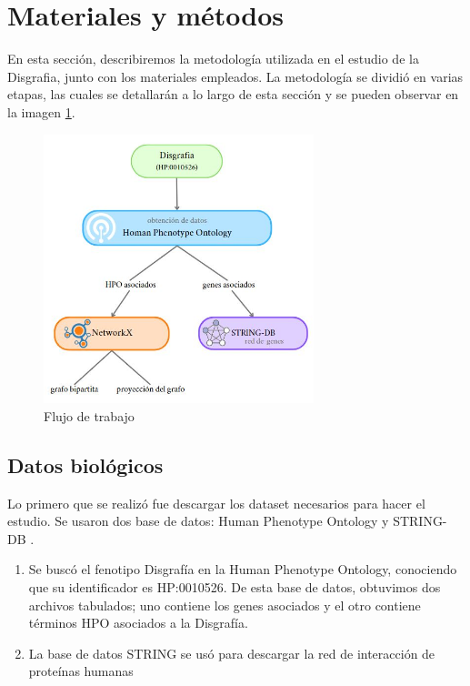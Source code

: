 \section{Materiales y métodos}

En esta sección, describiremos la metodología utilizada en el estudio de la Disgrafia,
junto con los materiales empleados. La metodología se dividió en varias etapas, las
cuales se detallarán a lo largo de esta sección y se pueden observar en la imagen \ref{fig:workflow}.

\begin{figure}[h!]
	\centering
	\includegraphics[width=0.7\textwidth]{figures/workflow.JPG}
	\caption{Flujo de trabajo}
	\label{fig:workflow}
\end{figure}

\subsection{Datos biológicos}

Lo primero que se realizó fue descargar los dataset necesarios para hacer el estudio. Se usaron dos base de datos: Human Phenotype Ontology \cite{HPO2021} y STRING-DB \cite{String2021}.

\begin{enumerate}
	\item Se buscó el fenotipo Disgrafía en la Human Phenotype Ontology, conociendo que su identificador es HP:0010526. De esta base de datos, obtuvimos dos archivos tabulados; uno contiene los genes asociados y el otro contiene términos HPO asociados a la Disgrafía.
	\item La base de datos STRING se usó para descargar la red de interacción de proteínas humanas
\end{enumerate}


